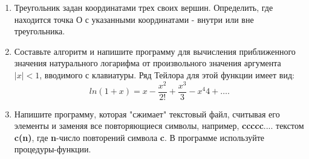\begin{enumerate}[leftmargin=*]
    \item Треугольник задан координатами трех своих вершин. Определить, где находится точка $О$ с указанными координатами - внутри или вне треугольника.
    \item Составьте алгоритм и напишите программу для вычисления приближенного значения натурального логарифма от произвольного значения аргумента $|x|<1$, вводимого с клавиатуры. Ряд Тейлора для этой функции имеет вид:
    \begin{equation*}
        ln(1+x)=x-\frac{x^2}{2!}+\frac{x^3}{3}-{x^4}{4}+\dots .
    \end{equation*}
    \item Напишите программу, которая "сжимает" текстовый файл, считывая его элементы и заменяя все повторяющиеся символы, например, \textbf{ccccc}.... текстом \textbf{c(n)}, где \textbf{n}-число повторений символа \textbf{c}. В программе используйте процедуры-функции.
\end{enumerate}